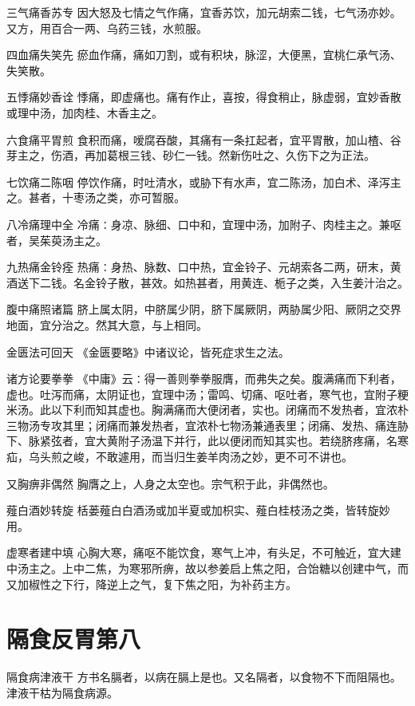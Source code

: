 \documentclass[a4paper,12pt,UTF8,twoside]{ctexbook}
\begin{document}
  三气痛香苏专
  因大怒及七情之气作痛，宜香苏饮，加元胡索二钱，七气汤亦妙。又方，用百合一两、乌药三钱，水煎服。
    
  四血痛失笑先
  瘀血作痛，痛如刀割，或有积块，脉涩，大便黑，宜桃仁承气汤、失笑散。
    
  五悸痛妙香诠
  悸痛，即虚痛也。痛有作止，喜按，得食稍止，脉虚弱，宜妙香散或理中汤，加肉桂、木香主之。
    
  六食痛平胃煎
  食积而痛，嗳腐吞酸，其痛有一条扛起者，宜平胃散，加山楂、谷芽主之，伤酒，再加葛根三钱、砂仁一钱。然新伤吐之、久伤下之为正法。
    
  七饮痛二陈咽
  停饮作痛，时吐清水，或胁下有水声，宜二陈汤，加白术、泽泻主之。甚者，十枣汤之类，亦可暂服。
    
  八冷痛理中全
  冷痛∶身凉、脉细、口中和，宜理中汤，加附子、肉桂主之。兼呕者，吴茱萸汤主之。
    
  九热痛金铃痊
  热痛∶身热、脉数、口中热，宜金铃子、元胡索各二两，研末，黄酒送下二钱。名金铃子散，甚效。如热甚者，用黄连、栀子之类，入生姜汁治之。
    
  腹中痛照诸篇
  脐上属太阴，中脐属少阴，脐下属厥阴，两胁属少阳、厥阴之交界地面，宜分治之。然其大意，与上相同。
    
  金匮法可回天
  《金匮要略》中诸议论，皆死症求生之法。
    
  诸方论要拳拳
  《中庸》云∶得一善则拳拳服膺，而弗失之矣。腹满痛而下利者，虚也。吐泻而痛，太阴证也，宜理中汤；雷鸣、切痛、呕吐者，寒气也，宜附子粳米汤。此以下利而知其虚也。胸满痛而大便闭者，实也。闭痛而不发热者，宜浓朴三物汤专攻其里；闭痛而兼发热者，宜浓朴七物汤兼通表里；闭痛、发热、痛连胁下、脉紧弦者，宜大黄附子汤温下并行，此以便闭而知其实也。若绕脐疼痛，名寒疝，乌头煎之峻，不敢遽用，而当归生姜羊肉汤之妙，更不可不讲也。
    
  又胸痹非偶然
  胸膺之上，人身之太空也。宗气积于此，非偶然也。
    
  薤白酒妙转旋
  栝蒌薤白白酒汤或加半夏或加枳实、薤白桂枝汤之类，皆转旋妙用。
    
  虚寒者建中填
  心胸大寒，痛呕不能饮食，寒气上冲，有头足，不可触近，宜大建中汤主之。上中二焦，为寒邪所痹，故以参姜启上焦之阳，合饴糖以创建中气，而又加椒性之下行，降逆上之气，复下焦之阳，为补药主方。
        
  \chapter{隔食反胃第八}
    隔食病津液干
    方书名膈者，以病在膈上是也。又名隔者，以食物不下而阻隔也。津液干枯为隔食病源。
    
\end{document}
